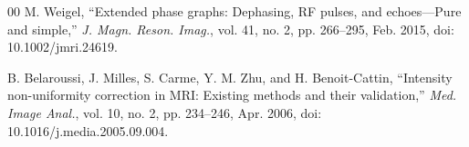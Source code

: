\documentclass[journal,twoside,web]{ieeecolor}
\begin{document}
\begin{thebibliography}{00}
 M. Weigel, ``Extended phase graphs: Dephasing, RF pulses, and echoes---Pure and simple,'' \emph{J. Magn. Reson. Imag.}, vol. 41, no. 2, pp. 266--295, Feb. 2015, doi: 10.1002/jmri.24619.

 B. Belaroussi, J. Milles, S. Carme, Y. M. Zhu, and H. Benoit-Cattin, ``Intensity non-uniformity correction in MRI: Existing methods and their validation,'' \emph{Med. Image Anal.}, vol. 10, no. 2, pp. 234--246, Apr. 2006, doi: 10.1016/j.media.2005.09.004.

\end{thebibliography}
\end{document}
